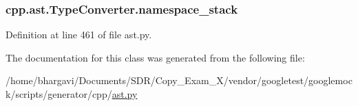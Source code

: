\subsubsection[{\texorpdfstring{namespace\+\_\+stack}{namespace_stack}}]{\setlength{\rightskip}{0pt plus 5cm}cpp.\+ast.\+Type\+Converter.\+namespace\+\_\+stack}\hypertarget{classcpp_1_1ast_1_1_type_converter_abb739f15c6cd0800e07c086c2b30833e}{}\label{classcpp_1_1ast_1_1_type_converter_abb739f15c6cd0800e07c086c2b30833e}


Definition at line 461 of file ast.\+py.



The documentation for this class was generated from the following file\+:\begin{DoxyCompactItemize}
\item 
/home/bhargavi/\+Documents/\+S\+D\+R/\+Copy\+\_\+\+Exam\+\_\+X/vendor/googletest/googlemock/scripts/generator/cpp/\hyperlink{ast_8py}{ast.\+py}\end{DoxyCompactItemize}
